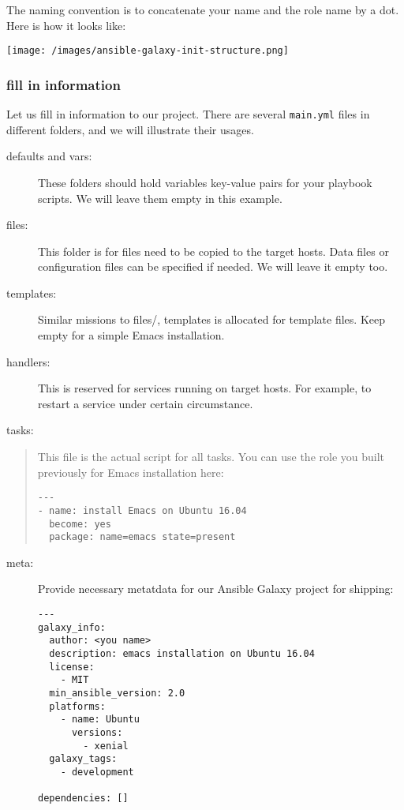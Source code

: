 The naming convention is to concatenate your name and the role name by a
dot. Here is how it looks like:

\texttt{[image: /images/ansible-galaxy-init-structure.png]}

\subsubsection{fill in information}\label{fill-in-information}

Let us fill in information to our project. There are several
\texttt{main.yml} files in different folders, and we will illustrate
their usages.

\begin{description}
\item[defaults and vars:]
These folders should hold variables key-value pairs for your playbook
scripts. We will leave them empty in this example.
\item[files:]
This folder is for files need to be copied to the target hosts. Data
files or configuration files can be specified if needed. We will leave
it empty too.
\item[templates:]
Similar missions to files/, templates is allocated for template files.
Keep empty for a simple Emacs installation.
\item[handlers:]
This is reserved for services running on target hosts. For example, to
restart a service under certain circumstance.
\end{description}

tasks:

\begin{quote}
This file is the actual script for all tasks. You can use the role you
built previously for Emacs installation here:

\begin{verbatim}
---
- name: install Emacs on Ubuntu 16.04
  become: yes
  package: name=emacs state=present
\end{verbatim}
\end{quote}

\begin{description}
\item[meta:]
Provide necessary metatdata for our Ansible Galaxy project for shipping:

\begin{verbatim}
---
galaxy_info:
  author: <you name>
  description: emacs installation on Ubuntu 16.04
  license:
    - MIT
  min_ansible_version: 2.0
  platforms:
    - name: Ubuntu
      versions:
        - xenial
  galaxy_tags:
    - development

dependencies: []
\end{verbatim}
\end{description}

